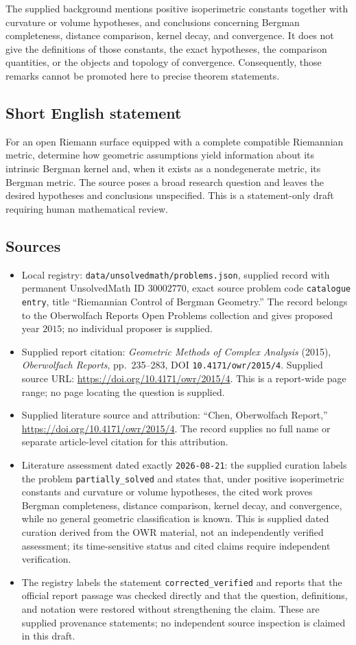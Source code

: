 \documentclass[11pt]{article}
\begin{document}
The supplied background mentions positive isoperimetric constants together with curvature or volume hypotheses, and conclusions concerning Bergman completeness, distance comparison, kernel decay, and convergence. It does not give the definitions of those constants, the exact hypotheses, the comparison quantities, or the objects and topology of convergence. Consequently, those remarks cannot be promoted here to precise theorem statements.
\subsection{Short English statement}
For an open Riemann surface equipped with a complete compatible Riemannian metric, determine how geometric assumptions yield information about its intrinsic Bergman kernel and, when it exists as a nondegenerate metric, its Bergman metric. The source poses a broad research question and leaves the desired hypotheses and conclusions unspecified. This is a statement-only draft requiring human mathematical review.
\subsection{Sources}
\begin{itemize}
\item Local registry: \texttt{data/unsolvedmath/problems.json}, supplied record with permanent UnsolvedMath ID \(30002770\), exact source problem code \texttt{catalogue entry}, title ``Riemannian Control of Bergman Geometry.'' The record belongs to the Oberwolfach Reports Open Problems collection and gives proposed year \(2015\); no individual proposer is supplied.
\item Supplied report citation: \emph{Geometric Methods of Complex Analysis} (2015), \emph{Oberwolfach Reports}, pp.\ 235--283, DOI \texttt{10.4171/owr/2015/4}. Supplied source URL: \url{https://doi.org/10.4171/owr/2015/4}. This is a report-wide page range; no page locating the question is supplied.
\item Supplied literature source and attribution: ``Chen, Oberwolfach Report,'' \url{https://doi.org/10.4171/owr/2015/4}. The record supplies no full name or separate article-level citation for this attribution.
\item Literature assessment dated exactly \texttt{2026-08-21}: the supplied curation labels the problem \texttt{partially\_solved} and states that, under positive isoperimetric constants and curvature or volume hypotheses, the cited work proves Bergman completeness, distance comparison, kernel decay, and convergence, while no general geometric classification is known. This is supplied dated curation derived from the OWR material, not an independently verified assessment; its time-sensitive status and cited claims require independent verification.
\item The registry labels the statement \texttt{corrected\_verified} and reports that the official report passage was checked directly and that the question, definitions, and notation were restored without strengthening the claim. These are supplied provenance statements; no independent source inspection is claimed in this draft.
\end{itemize}
\end{document}
